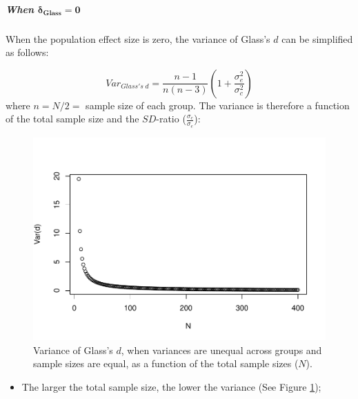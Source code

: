 \documentclass[
  english,
  man,mask]{apa6}
\providecommand{\tightlist}{%
  \setlength{\itemsep}{0pt}\setlength{\parskip}{0pt}}
\let\oldsubparagraph\subparagraph
\renewcommand{\subparagraph}[1]{\oldsubparagraph{#1}\mbox{}}
\begin{document}
\hypertarget{when-bmdelta_glass-0}{%
\subparagraph{\texorpdfstring{When \(\bm{\delta_{Glass} = 0}\)}{When \textbackslash bm\{\textbackslash delta\_\{Glass\} = 0\}}}\label{when-bmdelta_glass-0}}

When the population effect size is zero, the variance of Glass's \(d\) can be simplified as follows:

\[Var_{Glass's \; d} = \frac{n-1}{n(n-3)} \left( 1+\frac{\sigma^2_e}{\sigma^2_c}\right)\]
where \(n=N/2=\) sample size of each group. The variance is therefore a function of the total sample size and the \(SD\)-ratio (\(\frac{\sigma_c}{\sigma_e}\)):

\begin{figure}
\centering
\includegraphics{SupMat1_files/figure-latex/varglassHetbalNsize2-1.pdf}
\caption{\label{fig:varglassHetbalNsize2}Variance of Glass's \(d\), when variances are unequal across groups and sample sizes are equal, as a function of the total sample sizes (\(N\)).}
\end{figure}

\begin{itemize}
\tightlist
\item
  The larger the total sample size, the lower the variance (See Figure \ref{fig:varglassHetbalNsize2});
\end{itemize}
\end{document}
